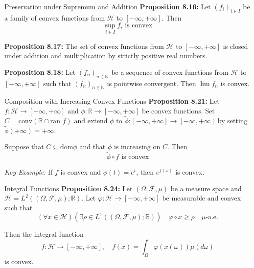 \documentclass[aspectratio=169,10pt]{beamer}
\begin{document}
\begin{frame}[fragile]{Preservation under Supremum and Addition}
    \textbf{Proposition 8.16:} Let $(f_i)_{i \in I}$ be a family of convex functions from $\mathcal{H}$ 
    to $[-\infty, +\infty]$. Then
    \[
    \sup_{i \in I} f_i \text{ is convex}
    \]

    \vspace{0.3cm}

    \textbf{Proposition 8.17:} The set of convex functions from $\mathcal{H}$ to $[-\infty, +\infty]$ is 
    closed under addition and multiplication by strictly positive real numbers.

    \vspace{0.3cm}

    \textbf{Proposition 8.18:} Let $(f_n)_{n \in \mathbb{N}}$ be a sequence of convex functions 
    from $\mathcal{H}$ to $[-\infty, +\infty]$ such that $(f_n)_{n \in \mathbb{N}}$ is pointwise convergent. 
    Then $\lim f_n$ is convex.
\end{frame}

\begin{frame}[fragile]{Composition with Increasing Convex Functions}
    \textbf{Proposition 8.21:} Let $f : \mathcal{H} \to [-\infty, +\infty]$ and $\phi : \mathbb{R} \to [-\infty, +\infty]$ 
    be convex functions. Set $C = \text{conv}(\mathbb{R} \cap \text{ran } f)$ and extend $\phi$ to 
    $\tilde{\phi} : [-\infty, +\infty] \to [-\infty, +\infty]$ by setting $\tilde{\phi}(+\infty) = +\infty$. 
    
    Suppose that $C \subseteq \text{dom} \phi$ and that $\phi$ is increasing on $C$. Then
    \[
    \tilde{\phi} \circ f \text{ is convex}
    \]

    \vspace{0.3cm}

    \textit{Key Example:} If $f$ is convex and $\phi(t) = e^t$, then $e^{f(x)}$ is convex.
\end{frame}

\begin{frame}[fragile]{Integral Functions}
    \textbf{Proposition 8.24:} Let $(\Omega, \mathcal{F}, \mu)$ be a measure space and 
    $\mathcal{H} = L^2((\Omega, \mathcal{F}, \mu); \mathbb{R})$. Let $\varphi : \mathcal{H} \to [-\infty, +\infty]$ 
    be measurable and convex such that
    \[
    (\forall x \in \mathcal{H})(\exists \rho \in L^1((\Omega, \mathcal{F}, \mu); \mathbb{R})) \quad 
    \varphi \circ x \geq \rho \quad \mu\text{-a.e.}
    \]
    
    Then the integral function
    \[
    f : \mathcal{H} \to [-\infty, +\infty], \quad f(x) = \int_\Omega \varphi(x(\omega)) \mu(d\omega)
    \]
    is convex.
\end{frame}
\end{document}
